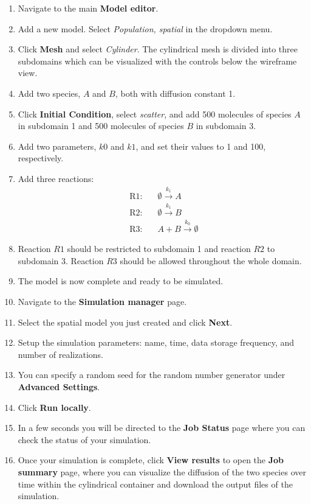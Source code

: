 \begin{enumerate}
\item Navigate to the main \textbf{Model editor}.
\item Add a new model. Select \textit{Population, spatial} in the dropdown menu.
 \item Click \textbf{Mesh} and select \textit{Cylinder}. The cylindrical mesh is divided into three subdomains which can be visualized with the controls below the wireframe view.
\item Add two species, $A$ and $B$, both with diffusion constant 1.
\item Click \textbf{Initial Condition}, select \textit{scatter}, and add 500 molecules of species $A$ in subdomain 1 and 500 molecules of species $B$ in subdomain 3. 
\item Add two parameters, $k0$ and $k1$, and set their values to 1 and 100, respectively.
\item Add three reactions:
\begin{align*}
\textrm{R1}:&\quad \emptyset\overset{k_1}{\rightarrow} A\\
\textrm{R2}:&\quad \emptyset\overset{k_1}{\rightarrow} B\\
\textrm{R3}:&\quad A+B\overset{k_0}{\rightarrow}\emptyset
\end{align*}
\item Reaction $R1$ should be restricted to subdomain 1 and reaction $R2$ to subdomain 3. Reaction $R3$ should be allowed throughout the whole domain.
\item The model is now complete and ready to be simulated.
\item Navigate to the \textbf{Simulation manager} page.
\item Select the spatial model you just created and click \textbf{Next}.
\item Setup the simulation parameters: name, time, data storage frequency, and number of realizations. 
\item You can specify a random seed for the random number generator under \textbf{Advanced Settings}.
\item Click \textbf{Run locally}.
\item In a few seconds you will be directed to the \textbf{Job Status} page where you can check the status of your simulation.
\item Once your simulation is complete, click \textbf{View results} to open the \textbf{Job summary} page, where you can visualize the diffusion of the two species over time within the cylindrical container and download the output files of the simulation.

\end{enumerate}


